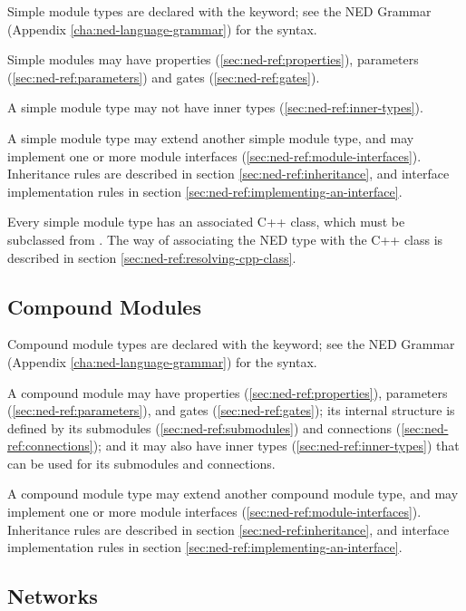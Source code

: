 Simple module types are declared with the  keyword;
see the NED Grammar (Appendix \ref{cha:ned-language-grammar}) for the
syntax.

Simple modules may have properties (\ref{sec:ned-ref:properties}),
parameters (\ref{sec:ned-ref:parameters})
and gates (\ref{sec:ned-ref:gates}).

A simple module type may not have inner types (\ref{sec:ned-ref:inner-types}).

A simple module type may extend another simple module type, and
may implement one or more module interfaces (\ref{sec:ned-ref:module-interfaces}).
Inheritance rules are described in section \ref{sec:ned-ref:inheritance},
and interface implementation rules in section \ref{sec:ned-ref:implementing-an-interface}.

Every simple module type has an associated C++ class, which must be
subclassed from . The way of associating the
NED type with the C++ class is described in section
\ref{sec:ned-ref:resolving-cpp-class}.



\subsection{Compound Modules}
\label{sec:ned-ref:compound-modules}

Compound module types are declared with the  keyword;
see the NED Grammar (Appendix \ref{cha:ned-language-grammar}) for the
syntax.

A compound module may have properties (\ref{sec:ned-ref:properties}),
parameters (\ref{sec:ned-ref:parameters}),
and gates (\ref{sec:ned-ref:gates}); its internal structure is defined by
its submodules (\ref{sec:ned-ref:submodules}) and
connections (\ref{sec:ned-ref:connections});
and it may also have inner types (\ref{sec:ned-ref:inner-types})
that can be used for its submodules and connections.

A compound module type may extend another compound module type, and
may implement one or more module interfaces (\ref{sec:ned-ref:module-interfaces}).
Inheritance rules are described in section \ref{sec:ned-ref:inheritance},
and interface implementation rules in section \ref{sec:ned-ref:implementing-an-interface}.



\subsection{Networks}
\label{sec:ned-ref:networks}

